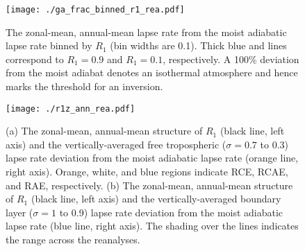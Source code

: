 \documentclass{ametsocV5}
\begin{document}
%

\begin{figure}
  \noindent\texttt{[image: ./ga\_frac\_binned\_r1\_rea.pdf]}\\
  \caption{The zonal-mean, annual-mean lapse rate from the moist adiabatic lapse rate binned by $R_{1}$ (bin widths are 0.1). Thick blue and  lines correspond to $R_1=0.9$ and $R_1=0.1$, respectively. A 100\% deviation from the moist adiabat denotes an isothermal atmosphere and hence marks the threshold for an inversion.}
  \label{fig:rea-binned-r1}
\end{figure}

\begin{figure}[t]
  \centering
  \noindent\texttt{[image: ./r1z\_ann\_rea.pdf]}\\
  \caption{(a) The zonal-mean, annual-mean structure of $R_1$ (black line, left axis) and the vertically-averaged free tropospheric ($\sigma=0.7$ to 0.3) lapse rate deviation from the moist adiabatic lapse rate (orange line, right axis). Orange, white, and blue regions indicate RCE, RCAE, and RAE, respectively. (b) The zonal-mean, annual-mean structure of $R_1$ (black line, left axis) and the vertically-averaged boundary layer ($\sigma=1$ to 0.9) lapse rate deviation from the moist adiabatic lapse rate (blue line, right axis). The shading over the lines indicates the range across the reanalyses.}
  \label{fig:rea-r1-ann}
\end{figure}
\end{document}
